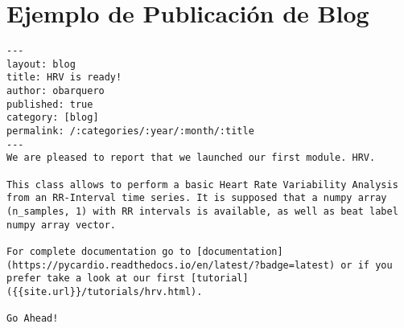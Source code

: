 \section{Ejemplo de Publicación de Blog}
\begin{lstlisting}[caption=Ejemplo de publicación de Blog,label={code:blogMD}]
---
layout: blog
title: HRV is ready!
author: obarquero
published: true
category: [blog]
permalink: /:categories/:year/:month/:title
---
We are pleased to report that we launched our first module. HRV.

This class allows to perform a basic Heart Rate Variability Analysis from an RR-Interval time series. It is supposed that a numpy array (n_samples, 1) with RR intervals is available, as well as beat label numpy array vector.

For complete documentation go to [documentation](https://pycardio.readthedocs.io/en/latest/?badge=latest) or if you prefer take a look at our first [tutorial]({{site.url}}/tutorials/hrv.html).

Go Ahead!
\end{lstlisting}


